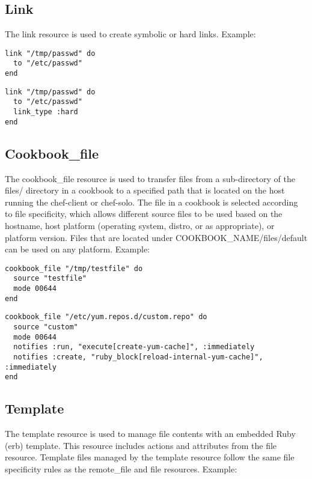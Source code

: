 \subsection{Link}

The link resource is used to create symbolic or hard links. Example:

\begin{lstlisting}[label=lst:cookbook-resources-cookbook-link1]
link "/tmp/passwd" do
  to "/etc/passwd"
end
\end{lstlisting}

\begin{lstlisting}[label=lst:cookbook-resources-cookbook-link2]
link "/tmp/passwd" do
  to "/etc/passwd"
  link_type :hard
end
\end{lstlisting}

\subsection{Cookbook\_file}

The cookbook\_file resource is used to transfer files from a sub-directory of the files/ directory in a cookbook to a specified path that is located on the host running the chef-client or chef-solo. The file in a cookbook is selected according to file specificity, which allows different source files to be used based on the hostname, host platform (operating system, distro, or as appropriate), or platform version. Files that are located under COOKBOOK\_NAME/files/default can be used on any platform. Example:

\begin{lstlisting}[label=lst:cookbook-resources-cookbook-file1]
cookbook_file "/tmp/testfile" do
  source "testfile"
  mode 00644
end
\end{lstlisting}

\begin{lstlisting}[label=lst:cookbook-resources-cookbook-file2]
cookbook_file "/etc/yum.repos.d/custom.repo" do
  source "custom"
  mode 00644
  notifies :run, "execute[create-yum-cache]", :immediately
  notifies :create, "ruby_block[reload-internal-yum-cache]", :immediately
end
\end{lstlisting}

\subsection{Template}

The template resource is used to manage file contents with an embedded Ruby (erb) template. This resource includes actions and attributes from the file resource. Template files managed by the template resource follow the same file specificity rules as the remote\_file and file resources. Example:

